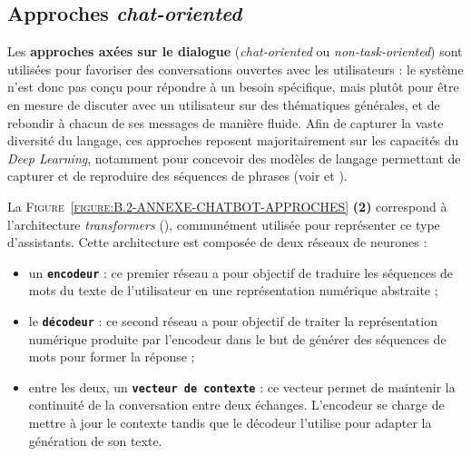 		
		\subsection{Approches \textit{chat-oriented}}
		\label{annex:B.2.2-ANNEXE-CHATBOTS-APPROCHES-CHAT-ORIENTED}
			
			Les \textbf{approches axées sur le dialogue} (\textit{chat-oriented} ou \textit{non-task-oriented}) sont utilisées pour favoriser des conversations ouvertes avec les utilisateurs : le système n'est donc pas conçu pour répondre à un besoin spécifique, mais plutôt pour être en mesure de discuter avec un utilisateur sur des thématiques générales, et de rebondir à chacun de ses messages de manière fluide.
			Afin de capturer la vaste diversité du langage, ces approches reposent majoritairement sur les capacités du \textit{Deep Learning}, notamment pour concevoir des modèles de langage permettant de capturer et de reproduire des séquences de phrases (voir \cite{ni-etal:2022:recent-advances-deep} et \cite{kumar-etal:2016:ask-me-anything}).
			
			La \textsc{Figure~\ref{figure:B.2-ANNEXE-CHATBOT-APPROCHES}} \textbf{(2)} correspond à l'architecture \textit{transformers} (\cite{uszkoreit:2017:transformer-novel-neural}), communément utilisée pour représenter ce type d'assistants.
			Cette architecture est composée de deux réseaux de neurones :
			\begin{itemize}
				\item un \textcolor{colorCarrotOrange}{\textbf{\texttt{encodeur}}} :
					ce premier réseau a pour objectif de traduire les séquences de mots du texte de l'utilisateur en une représentation numérique abstraite ;
				\item le \textcolor{colorSilverLakeBlue}{\textbf{\texttt{décodeur}}} :
					ce second réseau a pour objectif de traiter la représentation numérique produite par l'encodeur dans le but de générer des séquences de mots pour former la réponse ;
				\item entre les deux, un \textcolor{colorDarkPastelGreen}{\textbf{\texttt{vecteur de contexte}}} :
					ce vecteur permet de maintenir la continuité de la conversation entre deux échanges.
					L'encodeur se charge de mettre à jour le contexte tandis que le décodeur l'utilise pour adapter la génération de son texte.
			\end{itemize}
			
